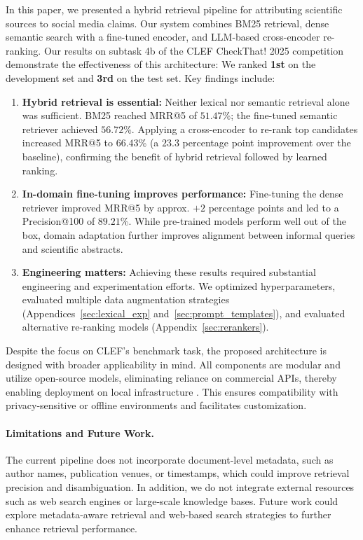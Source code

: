 %
%
In this paper, we presented a hybrid retrieval pipeline for attributing scientific sources to social media claims. Our system combines BM25 retrieval, dense semantic search with a fine-tuned encoder, and LLM-based cross-encoder re-ranking. Our results on subtask 4b of the CLEF CheckThat! 2025 competition demonstrate the effectiveness of this architecture: We ranked \textbf{1st} on the development set and \textbf{3rd} on the test set. Key findings include:


\begin{enumerate}
\item \textbf{Hybrid retrieval is essential:}  Neither lexical nor semantic retrieval alone was sufficient. BM25 reached MRR@5 of $51.47$\%; the fine-tuned semantic retriever achieved $56.72$\%. Applying a cross-encoder to re-rank top candidates increased MRR@5 to $66.43$\% (a $23.3$ percentage point improvement over the baseline), confirming the benefit of hybrid retrieval followed by learned ranking.

\item \textbf{In-domain fine-tuning improves performance:} Fine-tuning the dense retriever improved MRR@5 by approx. $+2$ percentage points and led to a Precision@100 of $89.21$\%. While pre-trained models perform well out of the box, domain adaptation further improves alignment between informal queries and scientific abstracts.

\item \textbf{Engineering matters:}
Achieving these results required substantial engineering and experimentation efforts. We optimized hyperparameters, evaluated multiple data augmentation strategies (Appendices~\ref{sec:lexical_exp} and~\ref{sec:prompt_templates}), and evaluated alternative re-ranking models (Appendix~\ref{sec:rerankers}).
\end{enumerate}

Despite the focus on CLEF’s benchmark task, the proposed architecture is designed with broader applicability in mind. All components are modular and utilize open-source models, eliminating reliance on commercial APIs, thereby enabling deployment on local infrastructure \cite{tuggener_so_2024}. This ensures compatibility with privacy-sensitive or offline environments and facilitates customization.


\paragraph{Limitations and Future Work.}
The current pipeline does not incorporate document-level metadata, such as author names, publication venues, or timestamps, which could improve retrieval precision and disambiguation. In addition, we do not integrate external resources such as web search engines or large-scale knowledge bases. Future work could explore metadata-aware retrieval and web-based search strategies to further enhance retrieval performance.
